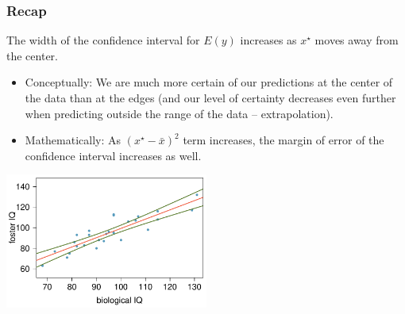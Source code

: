 \documentclass[slidestop,compress,mathserif,12pt,t,professionalfonts,xcolor=table]{beamer}
\begin{document}
\begin{frame}[fragile]
\frametitle{}

 
{
}
{
}


\end{frame}



\begin{frame}
\frametitle{Recap}

\vspace{-0.25cm}

The width of the confidence interval for $E(y)$ increases as $x^\star$ moves away from the center.

\begin{itemize}

\item Conceptually: We are much more certain of our predictions at the center of the data than at the edges (and our level of certainty decreases even further when predicting outside the range of the data -- extrapolation).

\item Mathematically: As $(x^\star - \bar{x})^2$ term increases, the margin of error of the confidence interval increases as well.

\end{itemize}

\begin{center}
\includegraphics[width=0.5\textwidth]{figures/twins/twins_IQ_cint}
\end{center}

\end{frame}
\end{document}
